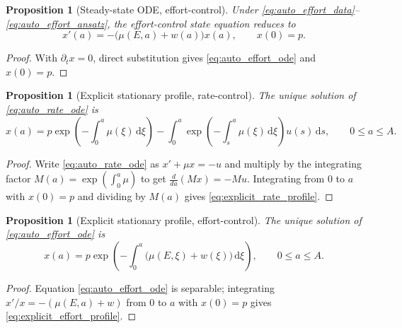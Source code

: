 \documentclass[pdflatex,sn-mathphys-num]{sn-jnl}
\newtheorem{proposition}[theorem]{Proposition}
\theoremstyle{definition}
\theoremstyle{remark}
\newcommand{\dd}{\,\mathrm{d}}
\begin{document}
\begin{proposition}[Steady-state ODE, effort-control]
\label{prop:auto_effort_ode}
Under \eqref{eq:auto_effort_data}--\eqref{eq:auto_effort_ansatz}, the
effort-control state equation reduces to
\begin{equation}\label{eq:auto_effort_ode}
x'(a)=-\bigl(\mu(E,a)+w(a)\bigr)x(a),\qquad x(0)=p.
\end{equation}
\end{proposition}
\begin{proof}
With $\partial_t x=0$, direct substitution gives \eqref{eq:auto_effort_ode}
and $x(0)=p$.
\end{proof}

\begin{proposition}[Explicit stationary profile, rate-control]
\label{prop:explicit_rate_profile}
The unique solution of \eqref{eq:auto_rate_ode} is
\begin{equation}\label{eq:explicit_rate_profile}
x(a)=p\exp\!\left(-\int_0^a\mu(\xi)\dd\xi\right)
-\int_0^a\exp\!\left(-\int_s^a\mu(\xi)\dd\xi\right)u(s)\dd s,
\qquad 0\le a\le A.
\end{equation}
\end{proposition}
\begin{proof}
Write \eqref{eq:auto_rate_ode} as $x'+\mu x=-u$ and multiply by the
integrating factor $M(a)=\exp(\int_0^a\mu)$ to get
$\frac{d}{da}(Mx)=-Mu$. Integrating from $0$ to $a$ with $x(0)=p$ and
dividing by $M(a)$ gives \eqref{eq:explicit_rate_profile}.
\end{proof}

\begin{proposition}[Explicit stationary profile, effort-control]
\label{prop:explicit_effort_profile}
The unique solution of \eqref{eq:auto_effort_ode} is
\begin{equation}\label{eq:explicit_effort_profile}
x(a)=p\exp\!\left(-\int_0^a\bigl(\mu(E,\xi)+w(\xi)\bigr)\dd\xi\right),
\qquad 0\le a\le A.
\end{equation}
\end{proposition}
\begin{proof}
Equation \eqref{eq:auto_effort_ode} is separable; integrating
$x'/x=-(\mu(E,a)+w)$ from $0$ to $a$ with $x(0)=p$ gives
\eqref{eq:explicit_effort_profile}.
\end{proof}
\end{document}

